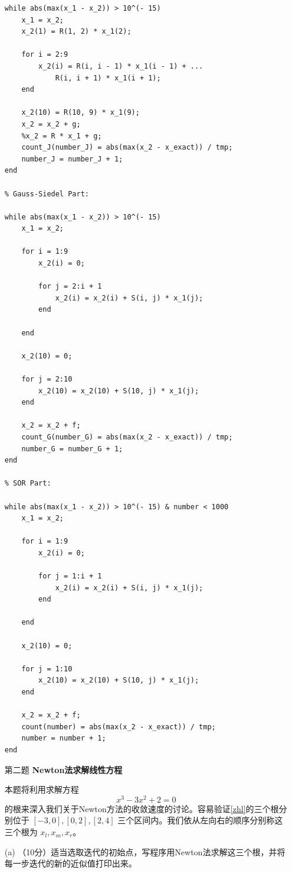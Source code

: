 \documentclass[12pt,a4paper,UTF8]{ctexart}
\begin{document}
\begin{enumerate}
\begin{lstlisting}[frame=single]
while abs(max(x_1 - x_2)) > 10^(- 15)
    x_1 = x_2;
    x_2(1) = R(1, 2) * x_1(2);

    for i = 2:9
        x_2(i) = R(i, i - 1) * x_1(i - 1) + ...
            R(i, i + 1) * x_1(i + 1);
    end

    x_2(10) = R(10, 9) * x_1(9);
    x_2 = x_2 + g;
    %x_2 = R * x_1 + g;
    count_J(number_J) = abs(max(x_2 - x_exact)) / tmp;
    number_J = number_J + 1;
end

% Gauss-Siedel Part:

while abs(max(x_1 - x_2)) > 10^(- 15)
    x_1 = x_2;

    for i = 1:9
        x_2(i) = 0;

        for j = 2:i + 1
            x_2(i) = x_2(i) + S(i, j) * x_1(j);
        end

    end

    x_2(10) = 0;

    for j = 2:10
        x_2(10) = x_2(10) + S(10, j) * x_1(j);
    end

    x_2 = x_2 + f;
    count_G(number_G) = abs(max(x_2 - x_exact)) / tmp;
    number_G = number_G + 1;
end

% SOR Part:

while abs(max(x_1 - x_2)) > 10^(- 15) & number < 1000
    x_1 = x_2;

    for i = 1:9
        x_2(i) = 0;

        for j = 1:i + 1
            x_2(i) = x_2(i) + S(i, j) * x_1(j);
        end

    end

    x_2(10) = 0;

    for j = 1:10
        x_2(10) = x_2(10) + S(10, j) * x_1(j);
    end

    x_2 = x_2 + f;
    count(number) = abs(max(x_2 - x_exact)) / tmp;
    number = number + 1;
end

\end{lstlisting}


    \item[第二题]\textbf{Newton法求解线性方程}

          本题将利用求解方程
          \begin{equation}\label{zhl}
              x^{3}-3 x^{2}+2=0
          \end{equation}
          的根来深入我们关于Newton方法的收敛速度的讨论。容易验证\eqref{zhl}的三个根分别位于 $[-3,0],[0,2],[2,4]$ 三个区间内。我们依从左向右的顺序分别称这三个根为 $x_{l}, x_{m}, x_{r}$。

          (a) （10分）适当选取迭代的初始点，写程序用Newton法求解这三个根，并将每一步迭代的新的近似值打印出来。


\end{enumerate}
\end{document}
